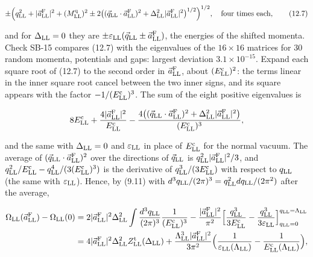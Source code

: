 \documentclass[
  10pt,
]{article}
\begin{document}
\[\pm\Big(q_{\rm LL}^2+\lvert\vec a^{\rm F}_{\rm LL}\rvert^2+(M^{\rm q}_{\rm LL})^2\pm2\big((\vec q_{\rm LL}\cdot\vec a^{\rm F}_{\rm LL})^2+\Delta_{\rm LL}^2\lvert\vec a^{\rm F}_{\rm LL}\rvert^2\big)^{1/2}\Big)^{1/2},\quad\text{four times each},\tag{12.7}\]

and for \(\Delta_{\rm LL}=0\) they are
\(\pm\varepsilon_{\rm LL}(\vec q_{\rm LL}\pm\vec a^{\rm F}_{\rm LL})\),
the energies of the shifted momenta. Check SB-15 compares (12.7) with
the eigenvalues of the \(16\times16\) matrices for 30 random momenta,
potentials and gaps: largest deviation \(3.1\times10^{-15}\). Expand
each square root of (12.7) to the second order in
\(\vec a^{\rm F}_{\rm LL}\), about \((E^{\rm c}_{\rm LL})^2\): the terms
linear in the inner square root cancel between the two inner signs, and
its square appears with the factor \(-1/(E^{\rm c}_{\rm LL})^3\). The
sum of the eight positive eigenvalues is

\[8E^{\rm c}_{\rm LL}+\frac{4\lvert\vec a^{\rm F}_{\rm LL}\rvert^2}{E^{\rm c}_{\rm LL}}-\frac{4\big((\vec q_{\rm LL}\cdot\vec a^{\rm F}_{\rm LL})^2+\Delta_{\rm LL}^2\lvert\vec a^{\rm F}_{\rm LL}\rvert^2\big)}{(E^{\rm c}_{\rm LL})^3},\]

and the same with \(\Delta_{\rm LL}=0\) and \(\varepsilon_{\rm LL}\) in
place of \(E^{\rm c}_{\rm LL}\) for the normal vacuum. The average of
\((\vec q_{\rm LL}\cdot\vec a^{\rm F}_{\rm LL})^2\) over the directions
of \(\vec q_{\rm LL}\) is
\(q_{\rm LL}^2\lvert\vec a^{\rm F}_{\rm LL}\rvert^2/3\), and
\(q_{\rm LL}^2/E^{\rm c}_{\rm LL}-q_{\rm LL}^4/(3(E^{\rm c}_{\rm LL})^3)\)
is the derivative of \(q_{\rm LL}^3/(3E^{\rm c}_{\rm LL})\) with respect
to \(q_{\rm LL}\) (the same with \(\varepsilon_{\rm LL}\)). Hence, by
(9.11) with \(d^3q_{\rm LL}/(2\pi)^3=q_{\rm LL}^2dq_{\rm LL}/(2\pi^2)\)
after the average,

\[\begin{aligned}\Omega_{\rm LL}(\vec a^{\rm F}_{\rm LL})-\Omega_{\rm LL}(0)&=2\lvert\vec a^{\rm F}_{\rm LL}\rvert^2\Delta_{\rm LL}^2\int\frac{d^3q_{\rm LL}}{(2\pi)^3}\frac1{(E^{\rm c}_{\rm LL})^3}-\frac{\lvert\vec a^{\rm F}_{\rm LL}\rvert^2}{\pi^2}\Big[\frac{q_{\rm LL}^3}{3E^{\rm c}_{\rm LL}}-\frac{q_{\rm LL}^3}{3\varepsilon_{\rm LL}}\Big]_{q_{\rm LL}=0}^{q_{\rm LL}=\Lambda_{\rm LL}}\\&=4\lvert\vec a^{\rm F}_{\rm LL}\rvert^2\Delta_{\rm LL}^2Z^{\rm t}_{\rm LL}(\Delta_{\rm LL})+\frac{\Lambda_{\rm LL}^3\lvert\vec a^{\rm F}_{\rm LL}\rvert^2}{3\pi^2}\Big(\frac1{\varepsilon_{\rm LL}(\Lambda_{\rm LL})}-\frac1{E^{\rm c}_{\rm LL}(\Lambda_{\rm LL})}\Big),\end{aligned}\]
\end{document}
